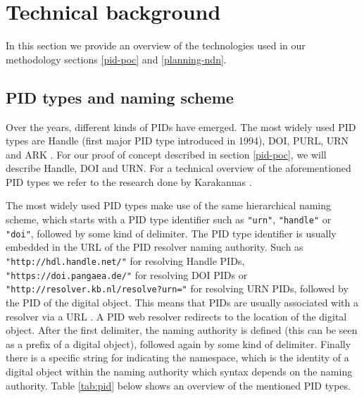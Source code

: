 \section{Technical background}
\label{tech-oview}

In this section we provide an overview of the technologies used in our methodology sections \ref{pid-poc} and \ref{planning-ndn}.

\subsection{PID types and naming scheme}\label{pid-types}
Over the years, different kinds of PIDs have emerged. The most widely used PID types are Handle (first major PID type introduced in 1994), DOI, PURL, URN and ARK \cite{pid-oview, odin, hdl}. For our proof of concept described in section \ref{pid-poc}, we will describe Handle, DOI and URN. For a technical overview of the aforementioned PID types we refer to the research done by Karakannas \cite{icn-bd}. 

The most widely used PID types make use of the same hierarchical naming scheme, which starts with a PID type identifier such as \texttt{"urn"}, \texttt{"handle"} or \texttt{"doi"}, followed by some kind of delimiter. The PID type identifier is usually embedded in the URL of the PID resolver naming authority. Such as \texttt{"http://hdl.handle.net/"} for resolving Handle PIDs, \texttt{"https://doi.pangaea.de/"} for resolving DOI PIDs or \texttt{"http://resolver.kb.nl/resolve?urn="} for resolving URN PIDs, followed by the PID of the digital object. This means that PIDs are usually associated with a resolver via a URL \cite{ids, icn-bd}. A PID web resolver redirects to the location of the digital object. After the first delimiter, the naming authority is defined (this can be seen as a prefix of a digital object), followed again by some kind of delimiter. Finally there is a specific string for indicating the namespace, which is the identity of a digital object within the naming authority which syntax depends on the naming
authority. Table \ref{tab:pid} below shows an overview of the mentioned PID types. 


